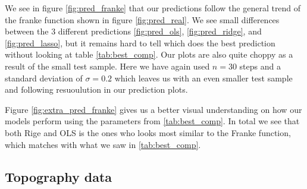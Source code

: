 \documentclass[12pt]{article}
\begin{document}
We see in figure \ref{fig:pred_franke} that our predictions follow the general trend of the franke function shown in figure \ref{fig:pred_real}. We see small differences between the 3 different predictions \ref{fig:pred_ols}, \ref{fig:pred_ridge}, and \ref{fig:pred_lasso}, but it remains hard to tell which does the best prediction without looking at table \ref{tab:best_comp}. Our plots are also quite choppy as a result of the small test sample. Here we have again used $n=30$ steps and a standard deviation of $\sigma=0.2$ which leaves us with an even smaller test sample and following resuoulution in our prediction plots.

Figure \ref{fig:extra_pred_franke} gives us a better visual understanding on how our models perform using the parameters from \ref{tab:best_comp}. In total we see that both Rige and OLS is the ones who looks most similar to the Franke function, which matches with what we saw in \ref{tab:best_comp}.
\subsection{Topography data}
\end{document}

